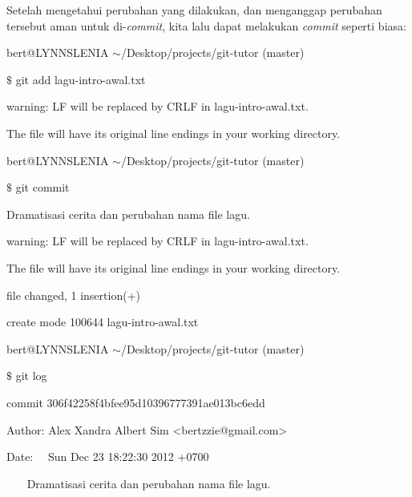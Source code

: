 Setelah mengetahui perubahan yang dilakukan, dan menganggap perubahan tersebut aman untuk di-\emph{commit}, kita lalu dapat melakukan \emph{commit} seperti biasa: \par
{\fontsize{10pt}{10pt}\selectfont bert@LYNNSLENIA  $  \sim  $/Desktop/projects/git-tutor (master)} \par
{\fontsize{10pt}{10pt}\selectfont  $  \$  $ git add lagu-intro-awal.txt} \par
{\fontsize{10pt}{10pt}\selectfont warning: LF will be replaced by CRLF in lagu-intro-awal.txt.} \par
{\fontsize{10pt}{10pt}\selectfont The file will have its original line endings in your working directory.} \par
\vspace{10pt}
{\fontsize{10pt}{10pt}\selectfont bert@LYNNSLENIA  $  \sim  $/Desktop/projects/git-tutor (master)} \par
{\fontsize{10pt}{10pt}\selectfont  $  \$  $ git commit} \par
{\fontsize{10pt}{10pt}\selectfont [master 306f422] Dramatisasi cerita dan perubahan nama file lagu.} \par
{\fontsize{10pt}{10pt}\selectfont warning: LF will be replaced by CRLF in lagu-intro-awal.txt.} \par
{\fontsize{10pt}{10pt}\selectfont The file will have its original line endings in your working directory.} \par
{\fontsize{10pt}{10pt} file changed, 1 insertion(+)} \par
{\fontsize{10pt}{10pt}\selectfont  create mode 100644 lagu-intro-awal.txt} \par
\vspace{10pt}
{\fontsize{10pt}{10pt}\selectfont bert@LYNNSLENIA  $  \sim  $/Desktop/projects/git-tutor (master)} \par
{\fontsize{10pt}{10pt}\selectfont  $  \$  $ git log} \par
{\fontsize{10pt}{10pt}\selectfont commit 306f42258f4bfee95d10396777391ae013bc6edd} \par
{\fontsize{10pt}{10pt}\selectfont Author: Alex Xandra Albert Sim <bertzzie@gmail.com>} \par
{\fontsize{10pt}{10pt}\selectfont Date:~~ Sun Dec 23 18:22:30 2012 +0700} \par
\vspace{10pt}
{\fontsize{10pt}{10pt}\selectfont ~~~ Dramatisasi cerita dan perubahan nama file lagu.} \par
\vspace{10pt}
